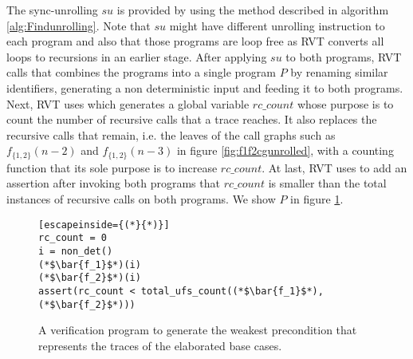 The sync-unrolling $su$ is provided by using the method described in algorithm \ref{alg:Findunrolling}. Note that $su$ might have different unrolling instruction to each program and also that those programs are loop free as RVT converts all loops to recursions in an earlier stage. After applying $su$ to both programs, RVT calls  that combines the programs into a single program $P$ by renaming similar identifiers, generating a non deterministic input and feeding it to both programs. Next, RVT uses  which generates a global variable $rc\_count$ whose purpose is to count the number of recursive calls that a trace reaches. It also replaces the recursive calls that remain, i.e. the leaves of the call graphs such as $f_{\{1,2\}}(n-2)$ and $f_{\{1,2\}}(n-3)$ in figure \ref{fig:f1f2cgunrolled}, with a counting function that its sole purpose is to increase $rc\_count$. At last, RVT uses   to add an assertion after invoking both programs that $rc\_count$ is smaller than the total instances of recursive calls on both programs. We show $P$ in figure \ref{fig:wp4basegap}.
\begin{figure} [h]
\begin{center}
\begin{minipage}{7 cm}
\begin{lstlisting}[escapeinside={(*}{*)}]
rc_count = 0
i = non_det()
(*$\bar{f_1}$*)(i)
(*$\bar{f_2}$*)(i)
assert(rc_count < total_ufs_count((*$\bar{f_1}$*),(*$\bar{f_2}$*)))
\end{lstlisting}
\end{minipage}
\caption{A verification program to generate the weakest precondition that represents the traces of the elaborated base cases.}
\label{fig:wp4basegap}
\end{center}
\end{figure}

